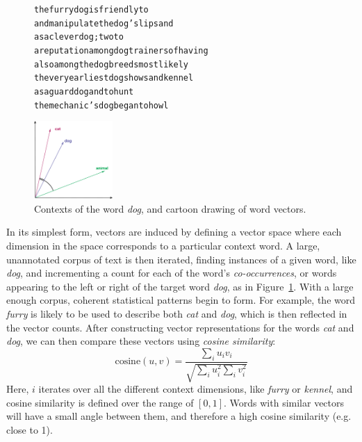 \documentclass[letterpaper]{article}
\begin{document}
\begin{figure}
\centering
\begin{minipage}{7cm}
\begin{scriptsize}
\begin{alltt}
         the furry {dog} is friendly to
and manipulate the {dog} 's lips and
       as a clever {dog} ; two to
a reputation among {dog} trainers of having
    also among the {dog} breeds most likely
 the very earliest {dog} shows and kennel
        as a guard {dog} and to hunt
   the mechanic 's {dog} began to howl
\end{alltt}
\end{scriptsize}
\end{minipage}\qquad
\begin{minipage}{3cm}
\includegraphics[width=3cm]{figures/vsm}
\end{minipage}
\caption{Contexts of the word {\em dog}, and cartoon drawing
of word vectors.}
\label{fig:vsm}
\end{figure}

In its simplest form, vectors are induced by defining a vector space where
each dimension in the space corresponds to a particular context word. A large,
unannotated corpus of text is then iterated, finding instances of a given word,
like {\em dog}, and incrementing a count for each of the word's {\em
co-occurrences}, or words appearing to the left or right of the target word
{\em dog}, as in Figure~\ref{fig:vsm}. With a large enough corpus, coherent
statistical patterns begin to form. For example, the word {\em furry} is likely
to be used to describe both {\em cat} and {\em dog}, which is then reflected in
the vector counts. After constructing vector representations for the words {\em
cat} and {\em dog}, we can then compare these vectors using {\em cosine
similarity}:
\begin{equation*}
  \text{cosine}(u, v) = \frac{\sum_i u_iv_i}{\sqrt{\sum_i u_i^2 \sum_i v_i^2}}
\end{equation*}
Here, $i$ iterates over all the different context dimensions, like {\em furry}
or {\em kennel}, and cosine similarity is defined over the range of $[0, 1]$.
Words with similar vectors will have a small angle between them, and therefore
a high cosine similarity (e.g. close to 1).
\end{document}
